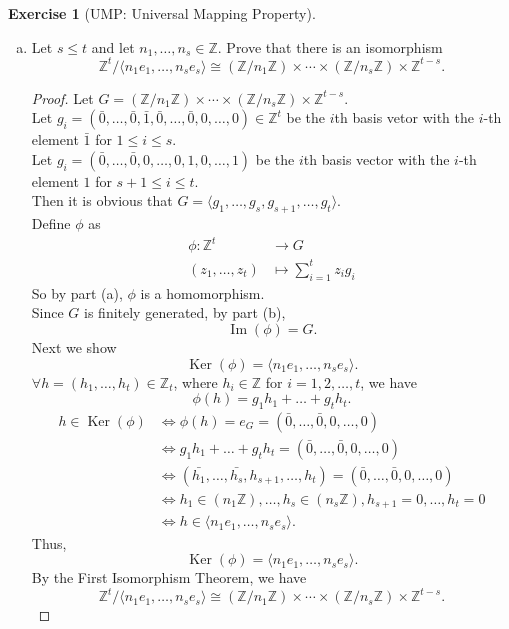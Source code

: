 \documentclass{amsart}
\newcommand{\bbz}{\mathbb{Z}}
\renewcommand{\ker}{\operatorname{Ker}}
\newcommand{\im}{\operatorname{Im}}
\theoremstyle{plain}
\theoremstyle{definition}
\newtheorem{exer}[lem]{Exercise}
\begin{document}
\begin{exer}[UMP: Universal Mapping Property]
\begin{enumerate}[(a)]
\begin{enumerate}[(i)]
\end{enumerate}
\item Let $s\leq t$ and let $n_1,\ldots,n_s\in\bbz$. 
Prove that 
there is an isomorphism $$\bbz^t/\langle n_1e_1,\ldots,n_se_s\rangle\cong(\bbz/n_1\bbz)\times\cdots\times(\bbz/n_s\bbz)\times\bbz^{t-s}.$$
\begin{proof}
  	Let $G = (\bbz/n_1\bbz)\times\cdots\times(\bbz/n_s\bbz)\times\bbz^{t-s}$.\\
  	Let $g_i = (\bar{0},\ldots,\bar{0},\bar{1},\bar{0},\ldots,\bar{0},0,\ldots,0)\in \bbz^t$ be the $i$th basis vetor with the $i$-th element $\bar{1}$ for $1 \leq i \leq s$.\\
  	Let $g_i = (\bar{0},\ldots,\bar{0},0,\ldots,0,1,0,\ldots,1)$ be the $i$th basis vector with the $i$-th element $1$ for $s+1 \leq i \leq t$.\\
  	Then it is obvious that $G = \langle g_1,\ldots,g_s,g_{s+1},\ldots,g_t \rangle$.\\
  Define $\phi$ as
  \begin{align*}
  	\phi: \bbz^t &\to G \\
  			(z_1,\dots,z_t) & \mapsto \sum_{i=1}^tz_ig_i 
  \end{align*}
	So by part (a), $\phi$ is a homomorphism.\\
	Since $G$ is finitely generated, by part (b),
	\[\im(\phi) = G.\]
	Next we show 
	\[\ker(\phi) = \langle n_1e_1,\ldots,n_se_s \rangle.\]
	$\forall h=(h_1,\ldots,h_t)\in \bbz_t$, where $h_i \in \bbz$ for $i = 1,2,\ldots,t$, we have
	\[\phi(h) = g_1{h_1}+\ldots +g_t{h_t}.\]
  	\begin{align*}
  	  h \in \ker(\phi) &\Leftrightarrow \phi(h) = e_G = (\bar{0},\ldots,\bar{0},0,\ldots,0) \\   
  	 			     				   	  &\Leftrightarrow g_1{h_1}+\ldots +g_t{h_t} = (\bar{0},\ldots,\bar{0},0,\ldots,0) \\
  	 			     				   	  &\Leftrightarrow (\bar{h_1},\ldots,\bar{h_s},h_{s+1},\ldots,h_t) = (\bar{0},\ldots,\bar{0},0,\ldots,0) \\
  	  					  			      &\Leftrightarrow h_1 \in (n_1\bbz),\ldots,h_s \in (n_s\bbz),h_{s+1} = 0,\ldots,h_{t} = 0 \\
  	  									  &\Leftrightarrow h  \in \langle n_1e_1,\ldots,n_se_s \rangle.
  	\end{align*}
    Thus,
    \[\ker(\phi) = \langle n_1e_1,\ldots,n_se_s \rangle.\]
    By the First Isomorphism Theorem, we have
    \[\bbz^t/\langle n_1e_1,\ldots,n_se_s\rangle\cong(\bbz/n_1\bbz)\times\cdots\times(\bbz/n_s\bbz)\times\bbz^{t-s}.\]
\end{proof}

\end{enumerate}
\end{exer}
\end{document}
